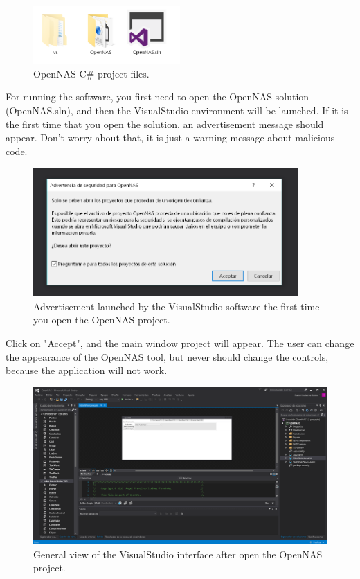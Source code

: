 \begin{figure}[H]
\centering
\includegraphics[width=0.5\textwidth]{images/Img10_OpenNAS_project.PNG}
\caption{\label{fig:OpenNAS_unziped_project}OpenNAS C\# project files.}
\end{figure}

For running the software, you first need to open the OpenNAS solution (OpenNAS.sln), and then the VisualStudio environment will be launched. If it is the first time that you open the solution, an advertisement message should appear. Don't worry about that, it is just a warning message about malicious code.

\begin{figure}[H]
\centering
\includegraphics[width=0.9\textwidth]{images/Img11_VS_Advertencia_Seguridad.PNG}
\caption{\label{fig:VS_advertisement}Advertisement launched by the VisualStudio software the first time you open the OpenNAS project.}
\end{figure}

Click on "Accept", and the main window project will appear. The user can change the appearance of the OpenNAS tool, but never should change the controls, because the application will not work.

\begin{figure}[H]
\centering
\includegraphics[width=1\textwidth]{images/Img12_VS_Proyecto.PNG}
\caption{\label{fig:VS_project}General view of the VisualStudio interface after open the OpenNAS project.}
\end{figure}

